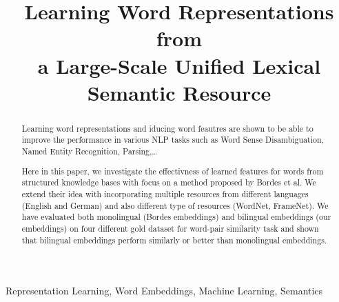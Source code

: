 \documentclass[preprint,12pt]{elsarticle}
\begin{document}
\begin{frontmatter}



\title{Learning Word Representations from \\a Large-Scale Unified Lexical Semantic Resource}


\author{}

\address{}

\begin{abstract}
Learning word representations and iducing word feautres are shown to be able to improve the performance
in various NLP tasks such as Word Sense Disambiguation, Named Entity Recognition, Parsing,\ldots

Here in this paper, we investigate the effectivness of learned features for words from structured knowledge bases
with focus on a method proposed by Bordes et al. We extend their idea with incorporating multiple resources from different languages
(English and German) and also different type of resources (WordNet, FrameNet).
 We have evaluated both monolingual (Bordes embeddings) and bilingual embeddings (our embeddings)
 on four different gold dataset
for word-pair similarity task and shown that bilingual embeddings perform similarly or better than monolingual embeddings.

\end{abstract}

\begin{keyword}
Representation Learning, Word Embeddings, Machine Learning, Semantics

\end{keyword}

\end{frontmatter}
\end{document}
